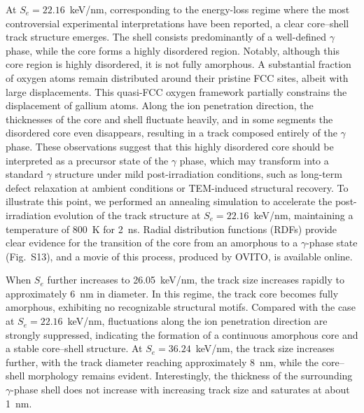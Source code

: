 \documentclass[aip,graphicx,amsmath,amssymb]{revtex4-1}
\begin{document}
At $S_e = 22.16$~keV/nm, corresponding to the energy-loss regime where the most
controversial experimental interpretations have been reported, a clear core--shell
track structure emerges.
The shell consists predominantly of a well-defined $\gamma$ phase, while the core
forms a highly disordered region.
Notably, although this core region is highly disordered, it is not fully amorphous.
A substantial fraction of oxygen atoms remain distributed around their pristine
FCC sites, albeit with large displacements.
This quasi-FCC oxygen framework partially constrains the displacement of gallium atoms.
Along the ion penetration direction, the thicknesses of the core and shell
fluctuate heavily, and in some segments the disordered core even disappears, resulting in
a track composed entirely of the $\gamma$ phase.
These observations suggest that this highly disordered core should be interpreted
as a precursor state of the $\gamma$ phase, which may transform into a standard 
$\gamma$ structure under mild post-irradiation conditions, such as
long-term defect relaxation at ambient conditions or TEM-induced structural recovery.
To illustrate this point, we performed an annealing simulation to accelerate the post-irradiation evolution 
of the track structure at $S_e = 22.16$~keV/nm, maintaining a temperature of 800~K for 2~ns. 
Radial distribution functions (RDFs) provide clear evidence for the transition of the core from an amorphous 
to a $\gamma$-phase state (Fig.~S13), and a movie of this process, produced by OVITO\cite{stukowskiVisualizationAnalysisAtomistic2010}, 
is available online.

When $S_e$ further increases to 26.05~keV/nm, the track size increases rapidly to 
approximately 6~nm in diameter.
In this regime, the track core becomes fully amorphous, exhibiting no recognizable
structural motifs.
Compared with the case at $S_e = 22.16$~keV/nm, fluctuations along the ion penetration
direction are strongly suppressed, indicating the formation of a continuous amorphous
core and a stable core--shell structure.
At $S_e = 36.24$~keV/nm, the track size increases further, with the track diameter
reaching approximately 8~nm, while the core--shell morphology remains evident.
Interestingly, the thickness of the surrounding $\gamma$-phase shell does not
increase with increasing track size and saturates at about 1~nm.
\end{document}
